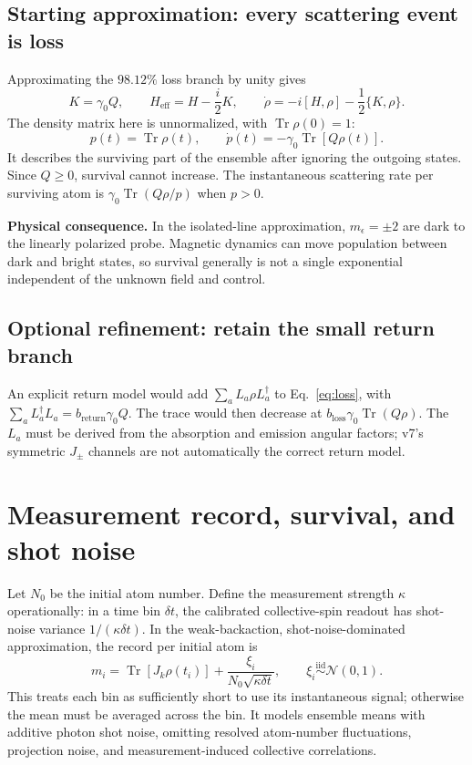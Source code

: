 \documentclass[11pt,letterpaper]{article}
\newcommand{\Tr}{\operatorname{Tr}}
\newcommand{\dt}{\delta t}
\newcommand{\Jk}{J_k}
\begin{document}
\subsection*{Starting approximation: every scattering event is loss}
Approximating the $98.12\%$ loss branch by unity gives
\begin{equation}
K=\gamma_0Q,\qquad
H_{\mathrm{eff}}=H-\frac{i}{2}K,\qquad
\boxed{\dot\rho=-i[H,\rho]-\frac12\{K,\rho\}.}
\label{eq:loss}
\end{equation}
The density matrix here is unnormalized, with $\Tr\rho(0)=1$:
\begin{equation}
p(t)=\Tr\rho(t),\qquad
\dot p(t)=-\gamma_0\Tr[Q\rho(t)].
\label{eq:survival}
\end{equation}
It describes the surviving part of the ensemble after ignoring the outgoing
states. Since $Q\ge0$, survival cannot increase. The instantaneous scattering
rate per surviving atom is $\gamma_0\Tr(Q\rho/p)$ when $p>0$.

\textbf{Physical consequence.} In the isolated-line approximation,
$m_\epsilon=\pm2$ are dark to the linearly polarized probe. Magnetic dynamics
can move population between dark and bright states, so survival generally is
not a single exponential independent of the unknown field and control.

\subsection*{Optional refinement: retain the small return branch}
An explicit return model would add $\sum_a L_a\rho L_a^\dagger$ to
Eq.~\eqref{eq:loss}, with
$\sum_a L_a^\dagger L_a=b_{\mathrm{return}}\gamma_0Q$.
The trace would then decrease at
$b_{\mathrm{loss}}\gamma_0\Tr(Q\rho)$. The $L_a$ must be derived from the
absorption and emission angular factors; v7's symmetric $J_\pm$ channels are
not automatically the correct return model.

\newpage
\section{Measurement record, survival, and shot noise}

Let $N_0$ be the initial atom number. Define the measurement strength $\kappa$
operationally: in a time bin $\dt$, the calibrated collective-spin readout has
shot-noise variance $1/(\kappa\dt)$. In the weak-backaction, shot-noise-dominated
approximation, the record per initial atom is
\begin{equation}
\boxed{
m_i=\Tr[\Jk\rho(t_i)]
+\frac{\xi_i}{N_0\sqrt{\kappa\dt}},
\qquad \xi_i\overset{\mathrm{iid}}{\sim}\mathcal N(0,1).
}
\label{eq:record}
\end{equation}
This treats each bin as sufficiently short to use its instantaneous signal;
otherwise the mean must be averaged across the bin. It models ensemble means
with additive photon shot noise, omitting resolved atom-number fluctuations,
projection noise, and measurement-induced collective correlations.
\end{document}
